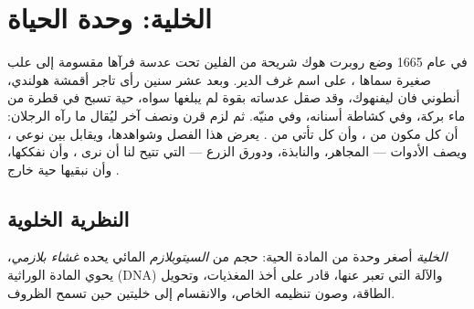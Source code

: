 \chapter{الخلية: وحدة الحياة}\label{ch:b1:cell-unit-of-life}

في عام 1665 وضع روبرت هوك شريحة من الفلين تحت عدسة فرآها مقسومة إلى
علب صغيرة سماها ، على اسم غرف الدير. وبعد عشر سنين رأى تاجر
أقمشة هولندي، أنطوني فان ليفنهوك، وقد صقل عدساته بقوة لم يبلغها
سواه،  حية تسبح في قطرة من ماء بركة، وفي كشاطة أسنانه، وفي
منيّه. ثم لزم قرن ونصف آخر ليُقال ما رآه الرجلان: أن كل 
مكون من ، وأن كل  تأتي من . يعرض هذا الفصل  وشواهدها، ويقابل بين نوعي ، ويصف الأدوات --- المجاهر،
والنابذة، ودورق الزرع --- التي تتيح لنا أن نرى ، وأن نفككها،
وأن نبقيها حية خارج .

\section{النظرية الخلوية}

\begin{definition}[الخلية]\label{def:b1:cell-unit-of-life:cell}
\emph{الخلية} أصغر وحدة من المادة الحية: حجم من
\emph{السيتوبلازم} المائي يحده \emph{غشاء
بلازمي}، يحوي المادة الوراثية (DNA) والآلة التي
تعبر عنها، قادر على أخذ المغذيات، وتحويل الطاقة، وصون تنظيمه الخاص،
والانقسام إلى خليتين حين تسمح الظروف.
\end{definition}

